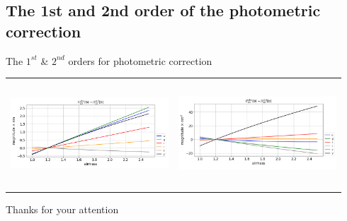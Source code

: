 \documentclass{beamer}
\begin{document}
\subsection{The 1st and 2nd order of the photometric correction}
\begin{frame}{The $1^{st}$ \& $2^{nd}$ orders for photometric correction}

\begin{tabular}{cc}
\includegraphics[width=5.9cm, height=4cm]{figs/Integrals_II/Integrals_II10_vs_airmass.png} & \includegraphics[width=5.9cm, height=4cm]{figs/Integrals_II/Integrals_II20_vs_airmass.png}
\end{tabular}
\end{frame}


\begin{frame}
\begin{center}
{

\LARGE \alert{Thanks for your attention}}

\end{center}

\end{frame}

 
\end{document}
